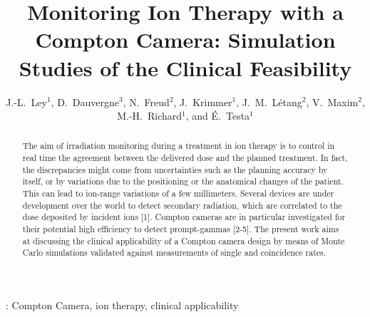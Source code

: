 \documentclass[11pt]{iopart}
\begin{document}
\title{Monitoring Ion Therapy with a Compton Camera: Simulation Studies of the Clinical Feasibility}

\author{J.-L.~Ley$^1$, D.~Dauvergne$^3$, N.~Freud$^2$, J.~Krimmer$^1$, J.~M.~L\'etang$^2$, V.~Maxim$^2$, M.-H.~Richard$^1$, and \'E.~Testa$^1$}

\address{$^1$Univ Lyon, Universit\'e Claude Bernard Lyon 1, CNRS/IN2P3, Institut de Physique Nucl\'eaire de Lyon, 69622 Villeurbanne, France}
\address{$^2$Univ Lyon, INSA-Lyon, Universit\'e Claude Bernard Lyon 1, UJM-Saint \'Etienne, CNRS, Inserm, Centre L\'eon B\'erard, CREATIS UMR 5220 U1206, F-69373, Lyon, France}
\address{$^3$LPSC, Universit\'e Grenoble-Alpes, CNRS/IN2P3 UMR5821, F-38026 Grenoble, France}

\begin{abstract}
The aim of irradiation monitoring during a treatment in ion therapy is to control in real time the agreement between the delivered dose and the planned treatment. In fact, the discrepancies might come from uncertainties such as the planning accuracy by itself, or by variations due to the positioning or the anatomical changes of the patient. This can lead to ion-range variations of a few millimeters. Several devices are under development over the world to detect secondary radiation, which are correlated to the dose deposited by incident ions [1]. Compton cameras are in particular investigated for their potential high efficiency to detect prompt-gammas [2-5]. The present work aims at discussing the clinical applicability of a Compton camera design by means of Monte Carlo simulations validated against measurements of single and coincidence rates.

\end{abstract}


\submitto{\PMB}
\vspace{2pc}
: Compton Camera, ion therapy, clinical applicability
\maketitle
%
\newpage
\end{document}
